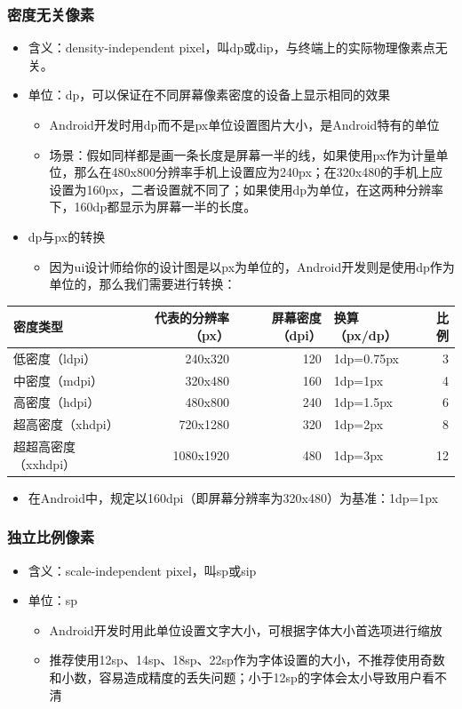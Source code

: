 \documentclass[9pt, b5paper]{article}
\begin{document}
\subsubsection{密度无关像素}
\label{sec-6-4-4}
\begin{itemize}
\item 含义：density-independent pixel，叫dp或dip，与终端上的实际物理像素点无关。
\item 单位：dp，可以保证在不同屏幕像素密度的设备上显示相同的效果
\begin{itemize}
\item Android开发时用dp而不是px单位设置图片大小，是Android特有的单位
\item 场景：假如同样都是画一条长度是屏幕一半的线，如果使用px作为计量单位，那么在480x800分辨率手机上设置应为240px；在320x480的手机上应设置为160px，二者设置就不同了；如果使用dp为单位，在这两种分辨率下，160dp都显示为屏幕一半的长度。
\end{itemize}
\item dp与px的转换
\begin{itemize}
\item 因为ui设计师给你的设计图是以px为单位的，Android开发则是使用dp作为单位的，那么我们需要进行转换：
\end{itemize}
\end{itemize}
\begin{center}
\begin{tabular}{lrrlr}
\hline
密度类型 & 代表的分辨率（px） & 屏幕密度（dpi） & 换算（px/dp） & 比例\\
\hline
低密度（ldpi） & 240x320 & 120 & 1dp=0.75px & 3\\
中密度（mdpi） & 320x480 & 160 & 1dp=1px & 4\\
高密度（hdpi） & 480x800 & 240 & 1dp=1.5px & 6\\
超高密度（xhdpi） & 720x1280 & 320 & 1dp=2px & 8\\
超超高密度（xxhdpi） & 1080x1920 & 480 & 1dp=3px & 12\\
\hline
\end{tabular}
\end{center}
\begin{itemize}
\item 在Android中，规定以160dpi（即屏幕分辨率为320x480）为基准：1dp=1px
\end{itemize}

\subsubsection{独立比例像素}
\label{sec-6-4-5}
\begin{itemize}
\item 含义：scale-independent pixel，叫sp或sip
\item 单位：sp
\begin{itemize}
\item Android开发时用此单位设置文字大小，可根据字体大小首选项进行缩放
\item 推荐使用12sp、14sp、18sp、22sp作为字体设置的大小，不推荐使用奇数和小数，容易造成精度的丢失问题；小于12sp的字体会太小导致用户看不清
\end{itemize}
\end{itemize}
\end{document}
